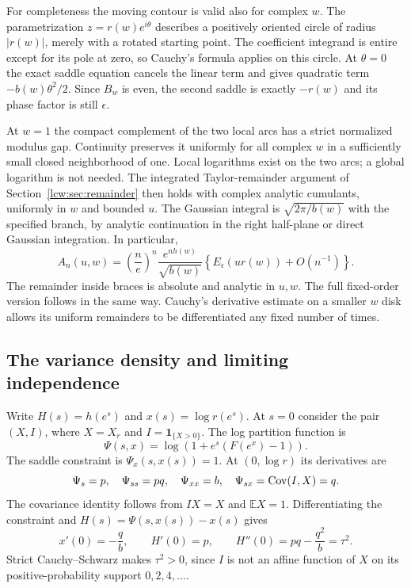 \documentclass[11pt,letterpaper]{article}
\theoremstyle{remark}\newtheorem{remark}[theorem]{Remark}
\newcommand{\E}{\mathbb E}\newcommand{\Pp}{\mathbb P}
\newcommand{\one}{\mathbf 1}\newcommand{\DD}{\mathcal D}
\begin{document}
For completeness the moving contour is valid also for complex $w$. The parametrization $z=r(w)e^{i\theta}$ describes a positively oriented circle of radius $|r(w)|$, merely with a rotated starting point. The coefficient integrand is entire except for its pole at zero, so Cauchy's formula applies on this circle. At $\theta=0$ the exact saddle equation cancels the linear term and gives quadratic term $-b(w)\theta^2/2$. Since $B_w$ is even, the second saddle is exactly $-r(w)$ and its phase factor is still $\epsilon$.

At $w=1$ the compact complement of the two local arcs has a strict normalized modulus gap. Continuity preserves it uniformly for all complex $w$ in a sufficiently small closed neighborhood of one. Local logarithms exist on the two arcs; a global logarithm is not needed. The integrated Taylor-remainder argument of Section~\ref{lcw:sec:remainder} then holds with complex analytic cumulants, uniformly in $w$ and bounded $u$. The Gaussian integral is $\sqrt{2\pi/b(w)}$ with the specified branch, by analytic continuation in the right half-plane or direct Gaussian integration. In particular,
\begin{equation}\label{lcw:eq:moving-leading}
 A_n(u,w)=\left(\frac ne\right)^n\frac{e^{nh(w)}}{\sqrt{b(w)}}
 \left\{E_\epsilon(ur(w))+O(n^{-1})\right\}.
\end{equation}
The remainder inside braces is absolute and analytic in $u,w$. The full fixed-order version follows in the same way. Cauchy's derivative estimate on a smaller $w$ disk allows its uniform remainders to be differentiated any fixed number of times.

\subsection{The variance density and limiting independence}
Write $H(s)=h(e^s)$ and $x(s)=\log r(e^s)$. At $s=0$ consider the pair $(X,I)$, where $X=X_r$ and $I=\one_{\{X>0\}}$. The log partition function is
\[
 \Psi(s,x)=\log\left(1+e^s(F(e^x)-1)\right).
\]
The saddle constraint is $\Psi_x(s,x(s))=1$. At $(0,\log r)$ its derivatives are
\[
 \Psi_s=p,\quad \Psi_{ss}=pq,\quad \Psi_{xx}=b,\quad
 \Psi_{sx}=\operatorname{Cov}(I,X)=q.
\]
The covariance identity follows from $IX=X$ and $\E X=1$. Differentiating the constraint and $H(s)=\Psi(s,x(s))-x(s)$ gives
\begin{equation}\label{lcw:eq:Hderivatives}
 x'(0)=-\frac qb,\qquad H'(0)=p,\qquad H''(0)=pq-\frac{q^2}{b}=\tau^2.
\end{equation}
Strict Cauchy--Schwarz makes $\tau^2>0$, since $I$ is not an affine function of $X$ on its positive-probability support $0,2,4,\ldots$.
\end{document}
